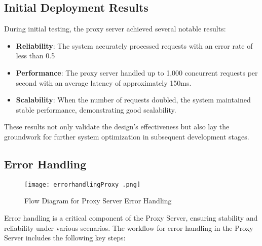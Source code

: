 \documentclass{article}
\begin{document}
\subsection{Initial Deployment Results}
During initial testing, the proxy server achieved several notable results:
\begin{itemize}
\item \textbf{Reliability}: The system accurately processed requests with an error rate of less than 0.5%
\item \textbf{Performance}: The proxy server handled up to 1,000 concurrent requests per second with an average latency of approximately 150ms.
\item \textbf{Scalability}: When the number of requests doubled, the system maintained stable performance, demonstrating good scalability.
\end{itemize}

These results not only validate the design's effectiveness but also lay the groundwork for further system optimization in subsequent development stages.
\subsection{Error Handling}
\begin{figure}[H]
\centering
\texttt{[image: errorhandlingProxy .png]}
\caption{Flow Diagram for Proxy Server Error Handling}
\label{fig:proxy_error_handling}
\end{figure}

Error handling is a critical component of the Proxy Server, ensuring stability and reliability under various scenarios. The workflow for error handling in the Proxy Server includes the following key steps:
\end{document}
